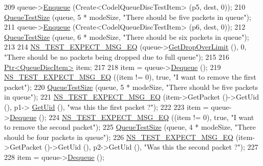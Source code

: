 \begin{DoxyCode}
209   queue->\hyperlink{classns3_1_1QueueDisc_af452fb01b98fed312125163f1fe85431}{Enqueue} (Create<CodelQueueDiscTestItem> (p5, dest, 0));
210   \hyperlink{classCoDelQueueDiscBasicEnqueueDequeue_abd4b321f709f67998f635c2f6567b993}{QueueTestSize} (queue, 5 * modeSize, \textcolor{stringliteral}{"There should be five packets in queue"});
211   queue->\hyperlink{classns3_1_1QueueDisc_af452fb01b98fed312125163f1fe85431}{Enqueue} (Create<CodelQueueDiscTestItem> (p6, dest, 0));
212   \hyperlink{classCoDelQueueDiscBasicEnqueueDequeue_abd4b321f709f67998f635c2f6567b993}{QueueTestSize} (queue, 6 * modeSize, \textcolor{stringliteral}{"There should be six packets in queue"});
213 
214   \hyperlink{group__testing_ga7304ba46a28d8cf08dfdfd6499cf7068}{NS\_TEST\_EXPECT\_MSG\_EQ} (queue->\hyperlink{classns3_1_1CoDelQueueDisc_adff74bb49a41862a99f5900f54b7ee39}{GetDropOverLimit} (), 0, \textcolor{stringliteral}{"There should
       be no packets being dropped due to full queue"});
215 
216   \hyperlink{classns3_1_1Ptr}{Ptr<QueueDiscItem>} item;
217 
218   item = queue->\hyperlink{classns3_1_1QueueDisc_a6c13fc489822c1487f61c2289f2e3629}{Dequeue} ();
219   \hyperlink{group__testing_ga7304ba46a28d8cf08dfdfd6499cf7068}{NS\_TEST\_EXPECT\_MSG\_EQ} ((item != 0), \textcolor{keyword}{true}, \textcolor{stringliteral}{"I want to remove the first packet"});
220   \hyperlink{classCoDelQueueDiscBasicEnqueueDequeue_abd4b321f709f67998f635c2f6567b993}{QueueTestSize} (queue, 5 * modeSize, \textcolor{stringliteral}{"There should be five packets in queue"});
221   \hyperlink{group__testing_ga7304ba46a28d8cf08dfdfd6499cf7068}{NS\_TEST\_EXPECT\_MSG\_EQ} (item->GetPacket ()->GetUid (), p1->
      \hyperlink{classns3_1_1Packet_a1f212c825b50e54d94f5b9ae99592e6a}{GetUid} (), \textcolor{stringliteral}{"was this the first packet ?"});
222 
223   item = queue->\hyperlink{classns3_1_1QueueDisc_a6c13fc489822c1487f61c2289f2e3629}{Dequeue} ();
224   \hyperlink{group__testing_ga7304ba46a28d8cf08dfdfd6499cf7068}{NS\_TEST\_EXPECT\_MSG\_EQ} ((item != 0), \textcolor{keyword}{true}, \textcolor{stringliteral}{"I want to remove the second packet"});
225   \hyperlink{classCoDelQueueDiscBasicEnqueueDequeue_abd4b321f709f67998f635c2f6567b993}{QueueTestSize} (queue, 4 * modeSize, \textcolor{stringliteral}{"There should be four packets in queue"});
226   \hyperlink{group__testing_ga7304ba46a28d8cf08dfdfd6499cf7068}{NS\_TEST\_EXPECT\_MSG\_EQ} (item->GetPacket ()->GetUid (), p2->GetUid (), \textcolor{stringliteral}{"Was this the
       second packet ?"});
227 
228   item = queue->\hyperlink{classns3_1_1QueueDisc_a6c13fc489822c1487f61c2289f2e3629}{Dequeue} ();

\end{DoxyCode}
